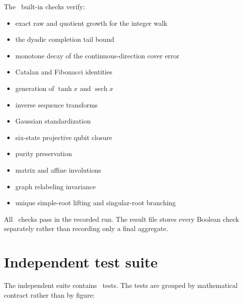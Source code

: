 \documentclass[11pt,openany]{report}
\theoremstyle{definition}
\theoremstyle{remark}
\begin{document}
The \BuiltInChecks\ built-in checks verify:
\begin{itemize}
\item exact raw and quotient growth for the integer walk
\item the dyadic completion tail bound
\item monotone decay of the continuous-direction cover error
\item Catalan and Fibonacci identities
\item generation of $\tanh x$ and $\operatorname{sech}x$
\item inverse sequence transforms
\item Gaussian standardization
\item six-state projective qubit closure
\item purity preservation
\item matrix and affine involutions
\item graph relabeling invariance
\item unique simple-root lifting and singular-root branching
\end{itemize}
All \BuiltInChecks\ checks pass in the recorded run. The result file stores every Boolean check separately rather than recording only a final aggregate.

\section{Independent test suite}

The independent suite contains \TestCount\ tests. The tests are grouped by mathematical contract rather than by figure:
\end{document}
